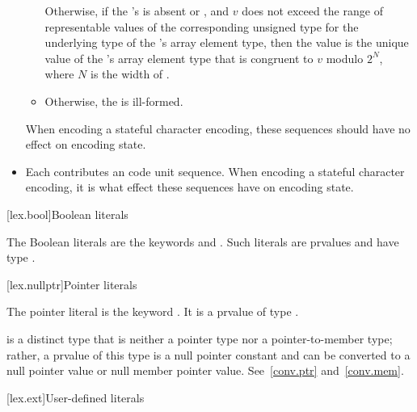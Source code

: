 \begin{itemize}
\begin{itemize}
Otherwise,
if the 's 
is absent or , and
$v$ does not exceed the range of representable values of
the corresponding unsigned type for the underlying type of
the 's array element type,
then the value is the unique value of
the 's array element type 
that is congruent to $v$ modulo $2^N$, where $N$ is the width of .
\item
Otherwise, the  is ill-formed.
\end{itemize}
When encoding a stateful character encoding,
these sequences should have no effect on encoding state.
\item
Each 
contributes an
code unit sequence.
When encoding a stateful character encoding,
it is
what effect these sequences have on encoding state.
\end{itemize}

[lex.bool]{Boolean literals}

%
\begin{bnf}
\br
    \br
\end{bnf}

\pnum
{}%
The Boolean literals are the keywords  and .
Such literals are prvalues and have type .

[lex.nullptr]{Pointer literals}

%
\begin{bnf}
\br
\end{bnf}

\pnum
The pointer literal is the keyword . It is a prvalue of type
.
\begin{note}
 is a distinct type that is neither a pointer type nor a pointer-to-member type;
rather, a prvalue of this type is a null pointer constant and can be
converted to a null pointer value or null member pointer value. See~\ref{conv.ptr}
and~\ref{conv.mem}.
\end{note}

[lex.ext]{User-defined literals}

